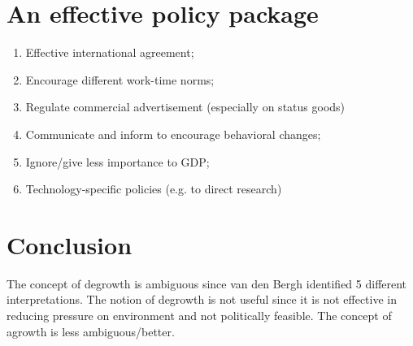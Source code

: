 \section*{An effective policy package}
\begin{enumerate}
\item Effective international agreement;
\item Encourage different work-time norms;
\item Regulate commercial advertisement (especially on status goods)
\item Communicate and inform to encourage behavioral changes;
\item Ignore/give less importance to GDP;
\item Technology-specific policies (e.g. to direct research)
\end{enumerate}

\section*{Conclusion}
The concept of degrowth is ambiguous since van den Bergh identified 5 different interpretations. The notion of degrowth is not useful since it is not effective in reducing pressure on environment and not politically feasible. The concept of agrowth is less ambiguous/better. 

\clearpage
